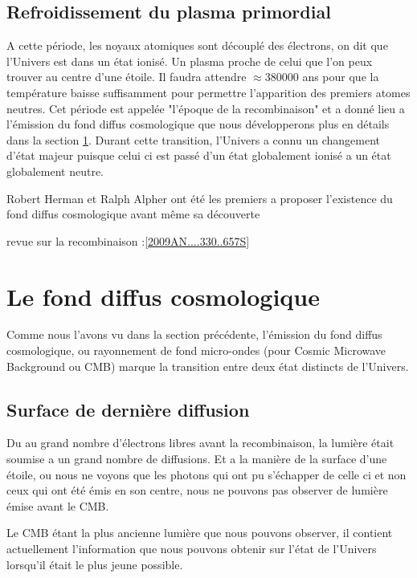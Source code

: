 \subsection{Refroidissement du plasma primordial}
A cette période, les noyaux atomiques sont découplé des électrons, on dit que l'Univers est dans un état ionisé.
Un plasma proche de celui que l'on peux trouver au centre d'une étoile.
Il faudra attendre $\approx 380 000$ ans pour que la température baisse suffisamment pour permettre l'apparition des premiers atomes neutres.
Cet période est appelée "l'époque de la recombinaison" et a donné lieu a l'émission du fond diffus cosmologique que nous développerons plus en détails dans la section \ref{sec:CMB}.
Durant cette transition, l'Univers a connu un changement d'état majeur puisque celui ci est passé d'un état globalement ionisé a un état globalement neutre.

Robert Herman et Ralph Alpher ont été les premiers a proposer l’existence du fond diffus cosmologique avant même sa découverte

revue sur la recombinaison :\ref{2009AN....330..657S}

\section{Le fond diffus cosmologique}
\label{sec:CMB}

Comme nous l'avons vu dans la section précédente, l’émission du fond diffus cosmologique, ou rayonnement de fond micro-ondes (pour Cosmic Microwave Background ou CMB) marque la transition entre deux état distincts de l'Univers.



\subsection{Surface de dernière diffusion}

Du au grand nombre d'électrons libres avant la recombinaison, la lumière était soumise a un grand nombre de diffusions.
Et a la manière de la surface d'une étoile, ou nous ne voyons que les photons qui ont pu s’échapper de celle ci et non ceux qui ont été émis en son centre, nous ne pouvons pas observer de lumière émise avant le CMB.

Le CMB étant la plus ancienne lumière que nous pouvons observer, il contient actuellement l'information que nous pouvons obtenir sur l'état de l'Univers lorsqu'il était le plus jeune possible.



